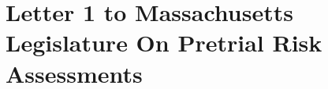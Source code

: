 
\chapter{Letter 1 to Massachusetts Legislature On Pretrial Risk Assessments}
\label{appendix:A}

\newpage

